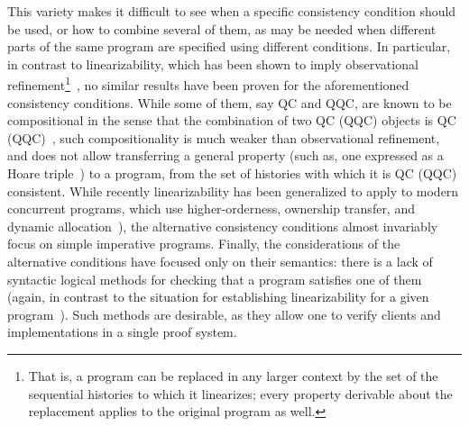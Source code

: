 %

This variety makes it difficult to see when a specific consistency
condition should be used, or how to combine several of them, as may be
needed when different parts of the same program are specified using
different conditions. In particular, in contrast to linearizability,
which has been shown to imply observational refinement\footnote{That is,
  a program can be replaced in any larger context by the set of the
  sequential histories to which it linearizes; every property
  derivable about the replacement applies to the original program as
  well.}~\cite{Filipovic-al:TCS10}, no similar results have been
proven for the aforementioned consistency conditions. While some of
them, say QC and QQC, are known to be compositional in the sense that
the combination of two QC (QQC) objects is QC
(QQC)~\cite{Herlihy-Shavit:08,Jagadeesan-Riely:ICALP14}, such
compositionality is much weaker than observational refinement, and does
not allow transferring a general property (such as, one expressed as a Hoare
triple~\cite{Turon-al:ICFP13,Liang-Feng:PLDI13}) to a program, from
the set of histories with which it is QC (QQC) consistent.
%
While recently linearizability has been generalized to apply to modern
%
concurrent programs, which use higher-orderness, ownership transfer,
and dynamic
allocation~\cite{Gotsman-Yang:CONCUR12,Cerone-al:ICALP14}), the
alternative consistency conditions almost invariably focus on 
simple imperative programs. Finally, the considerations of the
alternative conditions have focused only on their semantics: there
is a lack of syntactic logical methods for checking that a program
satisfies one of them (again, in contrast to the situation for
establishing linearizability for a given
program~\cite{OHearn-al:PODC10,Liang-Feng:PLDI13,Turon-al:ICFP13,Vafeiadis:PhD}). 
%
Such methods are desirable, as they allow one to verify clients and
implementations in a single proof system.
%


